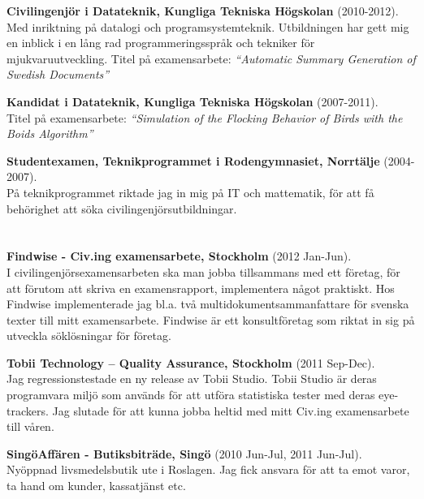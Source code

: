 \documentclass[margin,line]{resume}%
\begin{document}
\begin{resume}
	\textbf{Civilingenjör i Datateknik, Kungliga Tekniska Högskolan}
	(2010-2012).\\
	Med inriktning på datalogi och programsystemteknik.
	Utbildningen har gett mig en inblick i en lång rad programmeringsspråk och
	tekniker för mjukvaruutveckling. Titel på examensarbete: \textit{``Automatic Summary Generation of Swedish
	Documents''}

	\textbf{Kandidat i Datateknik, Kungliga Tekniska Högskolan}
	(2007-2011).\\
	Titel på examensarbete: \textit{``Simulation of the Flocking Behavior of
	Birds with the Boids Algorithm''}

	\textbf{Studentexamen, Teknikprogrammet i Rodengymnasiet, Norrtälje} (2004-2007).\\
	På teknikprogrammet riktade jag in mig på IT och mattematik,
	för att få behörighet att söka civilingenjörsutbildningar.

	\section{}\vspace{0.001mm}

		\textbf{Findwise - Civ.ing examensarbete, Stockholm } (2012 Jan-Jun).\\
		I civilingenjörsexamensarbeten ska man jobba tillsammans med ett företag, för att
		förutom att skriva en examensrapport, implementera något praktiskt.
		Hos Findwise implementerade jag bl.a. två multidokumentsammanfattare för
		svenska texter till mitt examensarbete. Findwise är ett konsultföretag som
		riktat in sig på utveckla söklösningar för företag.

\newpage
		\textbf{Tobii Technology – Quality Assurance, Stockholm} (2011 Sep-Dec).\\
		Jag regressionstestade en ny release av Tobii Studio. Tobii Studio är deras
		programvara miljö som används för att utföra statistiska tester med deras
		eye-trackers. Jag slutade för att kunna jobba heltid med mitt Civ.ing
		examensarbete till våren.

		\textbf{SingöAffären - Butiksbiträde, Singö} (2010 Jun-Jul, 2011 Jun-Jul).\\
		Nyöppnad livsmedelsbutik ute i Roslagen. Jag fick ansvara för att ta emot varor, ta
		hand om kunder, kassatjänst etc.

	\section{}\vspace{0.001mm}


\end{resume}
\end{document}
